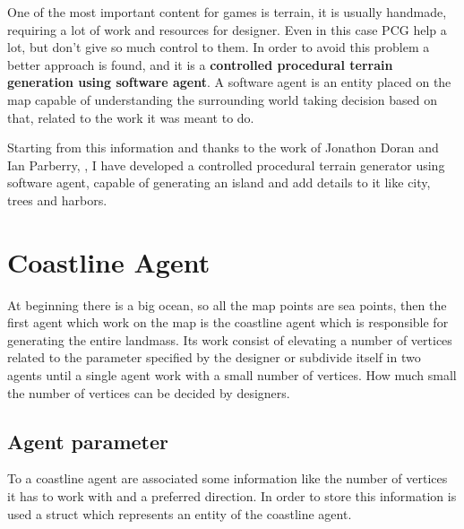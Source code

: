 \documentclass[12pt]{article}
\begin{document}
    One of the most important content for games is terrain, it is usually handmade, requiring a lot of work and resources for designer. Even in this case PCG help
    a lot, but don't give so much control to them. In order to avoid this problem a better approach is found, and it is a \textbf{controlled procedural terrain generation
    using software agent}. A software agent is an entity placed on the map capable of understanding the surrounding world taking decision based on that, related to
    the work it was meant to do.

    Starting from this information and thanks to the work of Jonathon Doran and Ian Parberry, \cite{article}, I have developed a controlled procedural terrain generator using software 
    agent, capable of generating an island and add details to it like city, trees and harbors.

    \newpage

    \section{Coastline Agent}
    At beginning there is a big ocean, so all the map points are sea points, then the first agent which work on the map is the coastline agent which is responsible for 
    generating the entire landmass. Its work consist of elevating a number of vertices related to the parameter specified by the designer or subdivide itself in two agents
    until a single agent work with a small number of vertices. How much small the number of vertices can be decided by designers.

    \subsection{Agent parameter}
    To a coastline agent are associated some information like the number of vertices it has to work with and a preferred direction. In order to store this information is used
    a struct which represents an entity of the coastline agent. 
\end{document}
